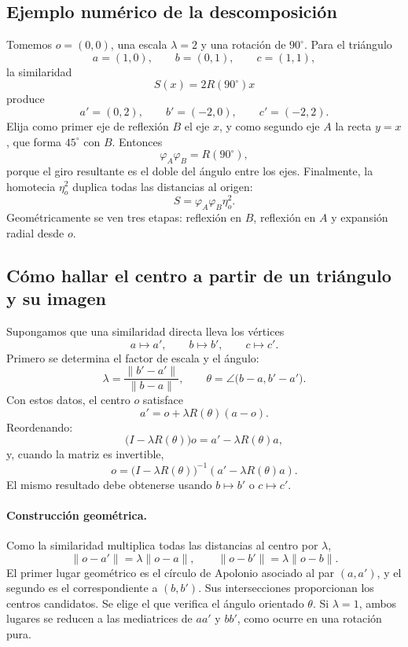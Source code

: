 \subsection{Ejemplo numérico de la descomposición}

Tomemos \(o=(0,0)\), una escala \(\lambda=2\) y una rotación de \(90^\circ\). Para el
triángulo
\[
  a=(1,0),\qquad b=(0,1),\qquad c=(1,1),
\]
la similaridad
\[
  S(x)=2R(90^\circ)x
\]
produce
\[
  a'=(0,2),\qquad b'=(-2,0),\qquad c'=(-2,2).
\]
Elija como primer eje de reflexión \(B\) el eje \(x\), y como segundo eje \(A\) la recta
\(y=x\), que forma \(45^\circ\) con \(B\). Entonces
\[
  \varphi_A\varphi_B=R(90^\circ),
\]
porque el giro resultante es el doble del ángulo entre los ejes. Finalmente, la homotecia
\(\eta_o^2\) duplica todas las distancias al origen:
\[
  \boxed{S=\varphi_A\varphi_B\eta_o^2}.
\]
Geométricamente se ven tres etapas: reflexión en \(B\), reflexión en \(A\) y expansión radial
desde \(o\).

\subsection{Cómo hallar el centro a partir de un triángulo y su imagen}

Supongamos que una similaridad directa lleva los vértices
\[
  a\mapsto a',\qquad b\mapsto b',\qquad c\mapsto c'.
\]
Primero se determina el factor de escala y el ángulo:
\[
  \lambda=\frac{\lVert b'-a'\rVert}{\lVert b-a\rVert},
  \qquad
  \theta=\angle\bigl(b-a,b'-a'\bigr).
\]
Con estos datos, el centro \(o\) satisface
\[
  a'=o+\lambda R(\theta)(a-o).
\]
Reordenando:
\[
  \bigl(I-\lambda R(\theta)\bigr)o
  =a'-\lambda R(\theta)a,
\]
y, cuando la matriz es invertible,
\[
  \boxed{
  o=
  \bigl(I-\lambda R(\theta)\bigr)^{-1}
  \left(a'-\lambda R(\theta)a\right)
  }.
\]
El mismo resultado debe obtenerse usando \(b\mapsto b'\) o \(c\mapsto c'\).

\paragraph{Construcción geométrica.}
Como la similaridad multiplica todas las distancias al centro por \(\lambda\),
\[
  \lVert o-a'\rVert=\lambda\lVert o-a\rVert,
  \qquad
  \lVert o-b'\rVert=\lambda\lVert o-b\rVert.
\]
El primer lugar geométrico es el círculo de Apolonio asociado al par \((a,a')\), y el segundo
es el correspondiente a \((b,b')\). Sus intersecciones proporcionan los centros candidatos.
Se elige el que verifica el ángulo orientado \(\theta\). Si \(\lambda=1\), ambos lugares se
reducen a las mediatrices de \(aa'\) y \(bb'\), como ocurre en una rotación pura.

